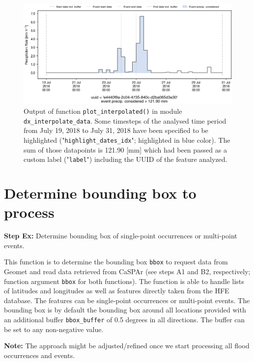 \documentclass[10pt,a4paper,titlepage,parskip]{scrartcl}
\begin{document}
\begin{figure}[h!]
	\centering
	\includegraphics[width=\linewidth]{figures/test-plot-interpolated.png}
	\caption{Output of function \texttt{plot\_interpolated()} in module \texttt{dx\_interpolate\_data}. Some timesteps of the analysed time period from July 19, 2018 to July 31, 2018 have been specified to be highlighted ("\texttt{highlight\_dates\_idx}"; highlighted in blue color). The sum of those datapoints is 121.90 [mm] which had been passed as a custom label ("\texttt{label}") including the UUID of the feature analyzed.}
	\label{fig:plot_example:plot_interpolated}
\end{figure}

\clearpage 

\section{Determine bounding box to process}

\textbf{Step Ex:} Determine bounding box of single-point occurrences or multi-point events.

This function is to determine the bounding box \texttt{bbox} to request data from Geomet and read data retrieved from CaSPAr (see steps A1 and B2, respectively; function argument \texttt{bbox} for both functions). The function is able to handle lists of latitudes and longitudes as well as features directly taken from the HFE database. The features can be single-point occurrences or multi-point events. The bounding box is by default the bounding box around all locations provided with an additional buffer \texttt{bbox\_buffer} of 0.5 degrees in all directions. The buffer can be set to any non-negative value.

\textbf{Note:} The approach might be adjusted/refined once we start processing all flood occurrences and events.
\end{document}

